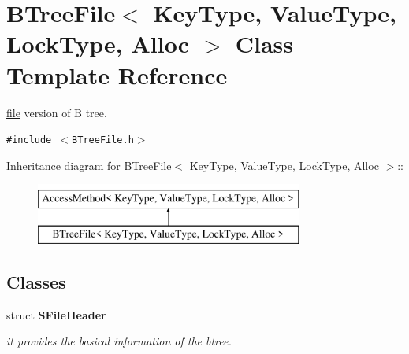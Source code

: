 \hypertarget{classBTreeFile}{
\section{BTreeFile$<$ KeyType, ValueType, LockType, Alloc $>$ Class Template Reference}
\label{classBTreeFile}
}
\hyperlink{classfile}{file} version of B tree.  


{\tt \#include $<$BTreeFile.h$>$}

Inheritance diagram for BTreeFile$<$ KeyType, ValueType, LockType, Alloc $>$::\begin{figure}[H]
\begin{center}
\leavevmode
\includegraphics[height=2cm]{classBTreeFile}
\end{center}
\end{figure}
\subsection*{Classes}
\begin{CompactItemize}
\item 
struct \textbf{SFileHeader}
\begin{CompactList}\small\item\em it provides the basical information of the btree. \item\end{CompactList}\end{CompactItemize}
